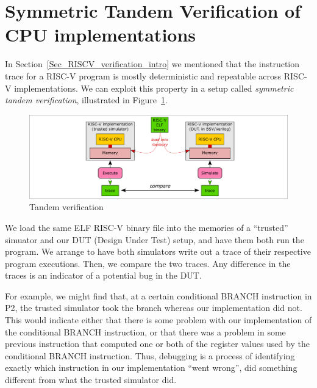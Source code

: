 
\section{Symmetric Tandem Verification of CPU implementations}

\label{Sec_Symmetric_Tandem_Verification}


In Section~\ref{Sec_RISCV_verification_intro} we mentioned that the
instruction trace for a RISC-V program is mostly deterministic and
repeatable across RISC-V implementations.  We can exploit this
property in a setup called \emph{symmetric tandem verification},
illustrated in Figure~\ref{Fig_tandem_verification}.
\begin{figure}[htbp]
  \centerline{\includegraphics[width=6in,angle=0]{Figures/Fig_tandem_verification}}
  \caption{\label{Fig_tandem_verification}
                  Tandem verification}
\end{figure}

We load the same ELF RISC-V binary file into the memories of a
``trusted'' simuator and our DUT (Design Under Test) setup, and have
them both run the program.  We arrange to have both simulators write
out a trace of their respective program executions.  Then, we compare
the two traces. Any difference in the traces is an indicator of a
potential bug in the DUT.

For example, we might find that, at a certain conditional BRANCH
instruction in P2, the trusted simulator took the branch whereas our
implementation did not.  This would indicate either that there is some
problem with our implementation of the conditional BRANCH instruction,
or that there was a problem in some previous instruction that computed
one or both of the register values used by the conditional BRANCH
instruction.  Thus, debugging is a process of identifying exactly
which instruction in our implementation ``went wrong'', {\ie} did
something different from what the trusted simulator did.


